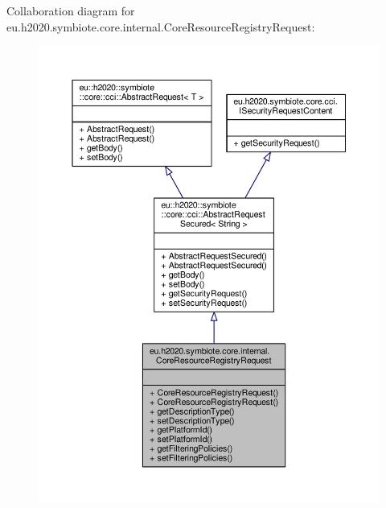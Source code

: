 Collaboration diagram for eu.\+h2020.\+symbiote.\+core.\+internal.\+Core\+Resource\+Registry\+Request\+:
\nopagebreak
\begin{figure}[H]
\begin{center}
\leavevmode
\includegraphics[width=350pt]{classeu_1_1h2020_1_1symbiote_1_1core_1_1internal_1_1CoreResourceRegistryRequest__coll__graph}
\end{center}
\end{figure}
